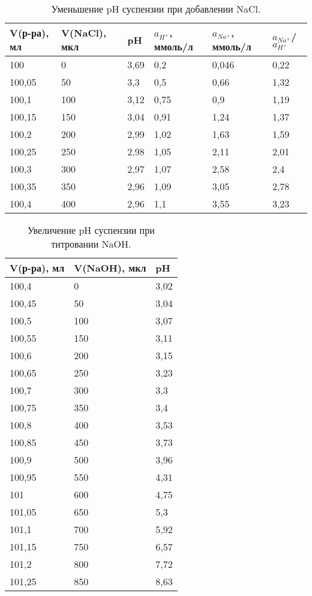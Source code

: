 \documentclass[a4paper,12pt]{article} %
\begin{document}
\begin{table}[H]
    \centering
    \begin{tabular}{|l|l|l|l|l|l|}
    \hline
        V(р-ра), мл & V(NaCl), мкл & pH & $a_{H^{+}}$, ммоль/л & $a_{Na^{+}}$, ммоль/л & $a_{Na^{+}}$/$a_{H^{+}}$ \\ \hline
        100 & 0 & 3,69 & 0,2  & 0,046 & 0,22\\ \hline
        100,05 & 50 & 3,3 &  0,5 & 0,66 & 1,32\\ \hline
        100,1 & 100 & 3,12 & 0,75 & 0,9 & 1,19 \\ \hline
        100,15 & 150 & 3,04 & 0,91 & 1,24 & 1,37\\ \hline
        100,2 & 200 & 2,99 & 1,02 & 1,63 & 1,59\\ \hline
        100,25 & 250 & 2,98 & 1,05  & 2,11 & 2,01\\ \hline
        100,3 & 300 & 2,97 & 1,07  &  2,58 & 2,4\\ \hline
        100,35 & 350 & 2,96 & 1,09  &  3,05 &2,78 \\ \hline
        100,4 & 400 & 2,96 &  1,1 & 3,55 & 3,23\\ \hline
    \end{tabular}
    \caption{Уменьшение pH суспензии при добавлении NaCl.}
\end{table}

\begin{table}[H]
\centering
    \begin{tabular}{|l|l|l|}
    \hline
        V(р-ра), мл & V(NaOH), мкл & pH \\ \hline
        100,4 & 0 & 3,02 \\ \hline
        100,45 & 50 & 3,04 \\ \hline
        100,5 & 100 & 3,07 \\ \hline
        100,55 & 150 & 3,11 \\ \hline
        100,6 & 200 & 3,15 \\ \hline
        100,65 & 250 & 3,23 \\ \hline
        100,7 & 300 & 3,3 \\ \hline
        100,75 & 350 & 3,4 \\ \hline
        100,8 & 400 & 3,53 \\ \hline
        100,85 & 450 & 3,73 \\ \hline
        100,9 & 500 & 3,96 \\ \hline
        100,95 & 550 & 4,31 \\ \hline
        101 & 600 & 4,75 \\ \hline
        101,05 & 650 & 5,3 \\ \hline
        101,1 & 700 & 5,92 \\ \hline
        101,15 & 750 & 6,57 \\ \hline
        101,2 & 800 & 7,72 \\ \hline
        101,25 & 850 & 8,63 \\ \hline
    \end{tabular}
    \caption{Увеличение pH суспензии при титровании NaOH.}
\end{table}
\end{document}
